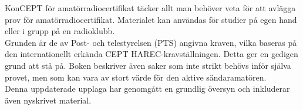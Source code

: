 
\AddToShipoutPicture*{\BackgroundPicLast}
\color{white}

\noindent KonCEPT för amatörradiocertifikat täcker allt man behöver veta för att
avlägga prov för amatörradiocertifikat. Materialet kan användas för
studier på egen hand eller i grupp på en radioklubb.\\[1ex]

\noindent Grunden är de av Post- och telestyrelsen (PTS) angivna
kraven, vilka baseras på den internationellt erkända CEPT
HAREC-kravställningen. Detta ger en gedigen grund att stå på. Boken
beskriver även saker som inte strikt behövs inför själva provet, men
som kan vara av stort värde för den aktive sändaramatören.\\[1ex]

\noindent Denna uppdaterade upplaga har genomgått en grundlig översyn
och inkluderar även nyskrivet material. \\[1ex]
